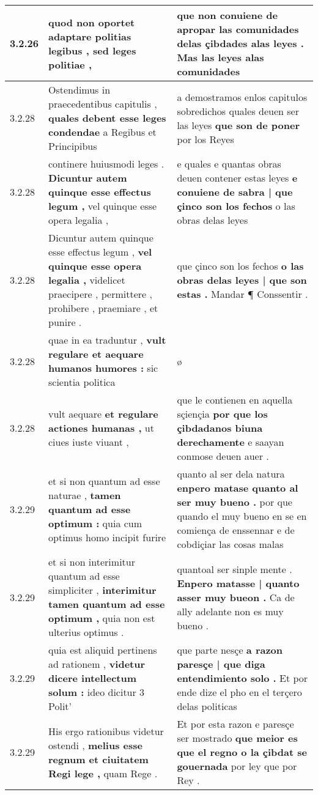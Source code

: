 \begin{tabular}{|p{1cm}|p{6.5cm}|p{6.5cm}|}
3.2.26 & quod non oportet \textbf{ adaptare politias legibus , } sed leges politiae , & que non conuiene de apropar las comunidades \textbf{ delas çibdades alas leyes . } Mas las leyes alas comunidades \\\hline
3.2.28 & Ostendimus in praecedentibus capitulis , \textbf{ quales debent esse leges condendae } a Regibus et Principibus & a demostramos enlos capitulos sobredichos quales deuen ser las leyes \textbf{ que son de poner } por los Reyes \\\hline
3.2.28 & continere huiusmodi leges . \textbf{ Dicuntur autem quinque esse effectus legum , } vel quinque esse opera legalia , & e quales e quantas obras deuen contener estas leyes \textbf{ e conuiene de sabra | que çinco son los fechos } o las obras delas leyes \\\hline
3.2.28 & Dicuntur autem quinque esse effectus legum , \textbf{ vel quinque esse opera legalia , } videlicet praecipere , permittere , prohibere , praemiare , et punire . & que çinco son los fechos \textbf{ o las obras delas leyes | que son estas . } Mandar ¶ Conssentir . \\\hline
3.2.28 & quae in ea traduntur , \textbf{ vult regulare et aequare humanos humores : } sic scientia politica & ø \\\hline
3.2.28 & vult aequare \textbf{ et regulare actiones humanas , } ut ciues iuste viuant , & que le contienen en aquella sçiençia \textbf{ por que los çibdadanos biuna derechamente } e saayan conmose deuen auer . \\\hline
3.2.29 & et si non quantum ad esse naturae , \textbf{ tamen quantum ad esse optimum : } quia cum optimus homo incipit furire & quanto al ser dela natura \textbf{ enpero matase quanto al ser muy bueno . } por que quando el muy bueno en se en comiença de enssennar e de cobdiçiar las cosas malas \\\hline
3.2.29 & et si non interimitur quantum ad esse simpliciter , \textbf{ interimitur tamen quantum ad esse optimum , } quia non est ulterius optimus . & quantoal ser sinple mente . \textbf{ Enpero matasse | quanto asser muy bueon . } Ca de ally adelante non es muy bueno . \\\hline
3.2.29 & quia est aliquid pertinens ad rationem , \textbf{ videtur dicere intellectum solum : } ideo dicitur 3 Polit’ & que parte nesçe \textbf{ a razon paresçe | que diga entendimiento solo . } Et por ende dize el pho en el terçero delas politicas \\\hline
3.2.29 & His ergo rationibus videtur ostendi , \textbf{ melius esse regnum et ciuitatem Regi lege , } quam Rege . & Et por esta razon e paresçe ser mostrado \textbf{ que meior es que el regno o la çibdat se gouernada } por ley que por Rey . \\\hline

\end{tabular}
